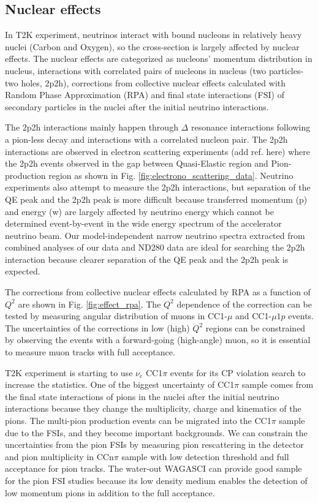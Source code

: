 \subsection{Nuclear effects}
In T2K experiment, neutrinos interact with bound nucleons in relatively heavy nuclei (Carbon and Oxygen), so the cross-section is largely affected by nuclear effects.
The nuclear effects are categorized as nucleons' momentum distribution in nucleus, interactions with  correlated pairs of nucleons in nucleus (two particles-two holes, 2p2h), corrections from collective nuclear effects calculated with Random Phase Approximation (RPA) and final state interactions (FSI) of secondary particles in the nuclei after the initial neutrino interactions.





The 2p2h interactions mainly happen through $\Delta$ resonance interactions following a pion-less decay and interactions with a correlated nucleon pair.
The 2p2h interactions are observed in electron scattering experiments (add ref. here) where the 2p2h events observed in the gap between Quasi-Elastic region and Pion-production region as shown in Fig. \ref{fig:electrono_scattering_data}.
Neutrino experiments also attempt to measure the 2p2h interactions, but separation of the QE peak and the 2p2h peak is more difficult because transferred momentum (p) and energy (w) are largely affected by  neutrino energy which cannot be determined event-by-event in the wide energy spectrum of the accelerator neutrino beam.
Our model-independent narrow neutrino spectra extracted from combined analyses of our data and ND280 data are ideal for searching the 2p2h interaction because clearer separation of the QE peak and the 2p2h peak is expected.


The corrections from collective nuclear effects calculated by RPA as a function of $Q^{2}$ are shown in Fig. \ref{fig:effect_rpa}.
The $Q^{2}$ dependence of the correction can be tested by measuring angular distribution of muons in CC1-$\mu$ and CC1-$\mu 1p$ events.
The uncertainties of the corrections in low (high) $Q^{2}$ regions can be constrained by observing the events with a forward-going (high-angle) muon, so it is essential to measure muon tracks with full acceptance.


T2K experiment is starting to use $\nu_{e}$ CC1$\pi$ events for its CP violation search to increase the statistics.
One of the biggest uncertainty of CC1$\pi$ sample comes from the final state interactions of pions in the nuclei after the initial neutrino interactions because they change the multiplicity, charge and kinematics of the pions.
The multi-pion production events can be migrated into the CC1$\pi$ sample due to the FSIs, and they become important backgrounds.
We can constrain the uncertainties from the pion FSIs by measuring pion rescattering in the detector and pion multiplicity in CCn$\pi$ sample with low detection threshold and full acceptance for pion tracks.
The water-out WAGASCI can provide good sample for the pion FSI studies because its low density medium enables the detection of low momentum pions in addition to the full acceptance.

